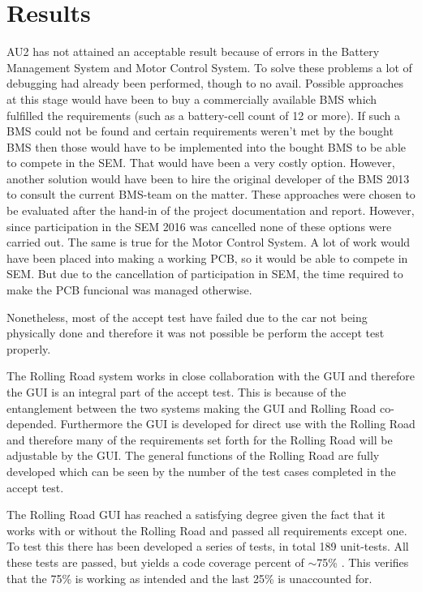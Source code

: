 \chapter{Results}
AU2 has not attained an acceptable result because of errors in the Battery Management System and Motor Control System. To solve these problems a lot of debugging had already been performed, though to no avail. Possible approaches at this stage would have been to buy a commercially available BMS which fulfilled the requirements (such as a battery-cell count of 12 or more). If such a BMS could not be found and certain requirements weren't met by the bought BMS then those would have to be implemented into the bought BMS to be able to compete in the SEM. That would have been a very costly option. However, another solution would have been to hire the original developer of the BMS 2013 to consult the current BMS-team on the matter. These approaches were chosen to be evaluated after the hand-in of the project documentation and report. However, since participation in the SEM 2016 was cancelled none of these options were carried out.
The same is true for the Motor Control System. A lot of work would have been placed into making a working PCB, so it would be able to compete in SEM. But due to the cancellation of participation in SEM, the time required to make the PCB funcional was managed otherwise.

Nonetheless, most of the accept test have failed due to the car not being physically done and therefore it was not possible be perform the accept test properly.

The Rolling Road system works in close collaboration with the GUI and therefore the GUI is an integral part of the accept test. This is because of the entanglement between the two systems making the GUI and Rolling Road co-depended. Furthermore the GUI is developed for direct use with the Rolling Road and therefore many of the requirements set forth for the Rolling Road will be adjustable by the GUI. The general functions of the Rolling Road are fully developed which can be seen by the number of the test cases completed in the accept test.

The Rolling Road GUI has reached a satisfying degree given the fact that it works with or without the Rolling Road and passed all requirements except one. To test this there has been developed a series of tests, in total 189 unit-tests. All these tests are passed, but yields a code coverage percent of $\sim$75\% . This verifies that the 75\% is working as intended and the last 25\% is unaccounted for.

